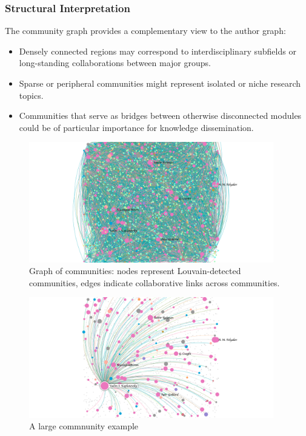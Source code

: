 \documentclass[12pt]{article}
\begin{document}
\subsubsection*{Structural Interpretation}

The community graph provides a complementary view to the author graph:
\begin{itemize}
    \item Densely connected regions may correspond to interdisciplinary subfields or long-standing collaborations between major groups.
    \item Sparse or peripheral communities might represent isolated or niche research topics.
    \item Communities that serve as bridges between otherwise disconnected modules could be of particular importance for knowledge dissemination.
\end{itemize}

\begin{figure}[H]
    \centering
    \includegraphics[width=0.95\textwidth]{pictures/graph-2.png}
    \caption{Graph of communities: nodes represent Louvain-detected communities, edges indicate collaborative links across communities.}
\end{figure}

\begin{figure}[H]
    \centering
    \includegraphics[width=0.95\textwidth]{pictures/graph2-2.png}
    \caption{A large commnunity example}
\end{figure}
\end{document}
